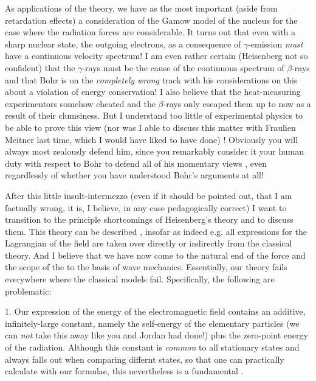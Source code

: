 \documentclass{article}
\begin{document}
As applications of the theory, we have  as the most important (aside from retardation effects) a consideration of the Gamow model of the nucleus for the case where the radiation forces are considerable. It turns out that even with a sharp nuclear state, the outgoing electrons, as a consequence of  $\gamma$-emission \textit{must} have a continuous velocity spectrum! I am even rather certain (Heisenberg not so confident) that the $\gamma$-rays must be the cause of the continuous spectrum of $\beta$-rays and that Bohr is on the \textit{completely wrong} track with his considerations on this about a violation of energy conservation! I also believe that the heat-measuring experimentors somehow cheated and the $\beta$-rays only escaped them up to now as a result of their clumsiness. But I understand too little of experimental physics to be able to prove this view (nor was I able to discuss this matter with Fraulien Meitner last time, which I would have liked to have done) ! Obviously you will always most zealously defend him, since you remarkably consider it your human duty with respect to Bohr to defend all of his momentary views  , even regardlessly of whether you have understood Bohr's arguments at all!

After this little insult-intermezzo (even if it should be pointed out, that I am factually wrong, it is, I believe, in any case pedagogically correct) I want to transition to the principle shortcomings of Heisenberg's theory and to discuss them. This theory can be described , insofar as indeed e.g. all expressions for the Lagrangian of the field are taken over directly or indirectly from the classical theory. And I believe that we have now come to the natural end of the force and the scope of the  to the basis of wave mechanics. Essentially, our theory fails everywhere where the classical models fail. Specifically, the following are problematic:

1. Our expression of the energy of the electromagnetic field contains an additive, infinitely-large constant, namely the self-energy of the elementary particles (we can \textit{not} take this away like you and Jordan had done!) plus the zero-point energy of the radiation. Although this constant is \textit{common} to all stationary states and always falls out when comparing differnt states, so that one can practically calculate with our formulae, this nevertheless is a fundamental .
\end{document}
